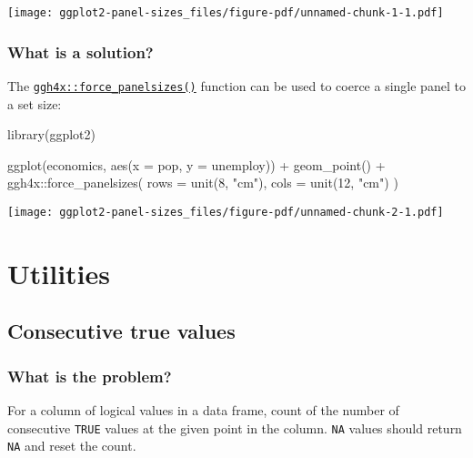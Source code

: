 \documentclass[
  letterpaper,
  DIV=11,
  numbers=noendperiod]{scrreprt}
\newenvironment{Shaded}{\begin{snugshade}}{\end{snugshade}}
\newcommand{\AttributeTok}[1]{\textcolor[rgb]{0.40,0.45,0.13}{#1}}
\newcommand{\DecValTok}[1]{\textcolor[rgb]{0.68,0.00,0.00}{#1}}
\newcommand{\FunctionTok}[1]{\textcolor[rgb]{0.28,0.35,0.67}{#1}}
\newcommand{\NormalTok}[1]{\textcolor[rgb]{0.00,0.23,0.31}{#1}}
\newcommand{\SpecialCharTok}[1]{\textcolor[rgb]{0.37,0.37,0.37}{#1}}
\newcommand{\StringTok}[1]{\textcolor[rgb]{0.13,0.47,0.30}{#1}}
\begin{document}
\texttt{[image: ggplot2-panel-sizes\_files/figure-pdf/unnamed-chunk-1-1.pdf]}

\section{What is a solution?}\label{what-is-a-solution-2}

The
\href{https://teunbrand.github.io/ggh4x/reference/force_panelsizes.html}{\texttt{ggh4x::force\_panelsizes()}}
function can be used to coerce a single panel to a set size:

\begin{Shaded}
\begin{Highlighting}[]
\FunctionTok{library}\NormalTok{(ggplot2)}

\FunctionTok{ggplot}\NormalTok{(economics, }\FunctionTok{aes}\NormalTok{(}\AttributeTok{x =}\NormalTok{ pop, }\AttributeTok{y =}\NormalTok{ unemploy)) }\SpecialCharTok{+}
  \FunctionTok{geom\_point}\NormalTok{() }\SpecialCharTok{+}
\NormalTok{  ggh4x}\SpecialCharTok{::}\FunctionTok{force\_panelsizes}\NormalTok{(}
    \AttributeTok{rows =} \FunctionTok{unit}\NormalTok{(}\DecValTok{8}\NormalTok{, }\StringTok{"cm"}\NormalTok{),}
    \AttributeTok{cols =} \FunctionTok{unit}\NormalTok{(}\DecValTok{12}\NormalTok{, }\StringTok{"cm"}\NormalTok{)}
\NormalTok{  )}
\end{Highlighting}
\end{Shaded}

\texttt{[image: ggplot2-panel-sizes\_files/figure-pdf/unnamed-chunk-2-1.pdf]}

\part{Utilities}

\chapter{Consecutive true values}\label{consecutive-true-values}

\section{What is the problem?}\label{what-is-the-problem-4}

For a column of logical values in a data frame, count of the number of
consecutive \texttt{TRUE} values at the given point in the column.
\texttt{NA} values should return \texttt{NA} and reset the count.
\end{document}
